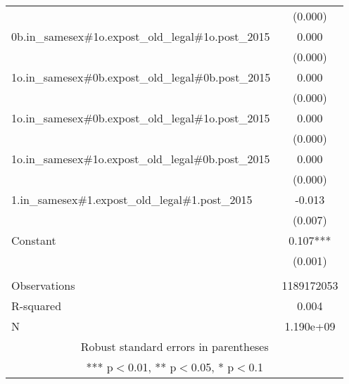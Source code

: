 \documentclass[]{article}
\begin{document}
\begin{tabular}{lc}
 & (0.000) \\
0b.in\_samesex\#1o.expost\_old\_legal\#1o.post\_2015 & 0.000 \\
 & (0.000) \\
1o.in\_samesex\#0b.expost\_old\_legal\#0b.post\_2015 & 0.000 \\
 & (0.000) \\
1o.in\_samesex\#0b.expost\_old\_legal\#1o.post\_2015 & 0.000 \\
 & (0.000) \\
1o.in\_samesex\#1o.expost\_old\_legal\#0b.post\_2015 & 0.000 \\
 & (0.000) \\
1.in\_samesex\#1.expost\_old\_legal\#1.post\_2015 & -0.013 \\
 & (0.007) \\
Constant & 0.107*** \\
 & (0.001) \\
 &  \\
Observations & 1189172053 \\
R-squared & 0.004 \\
 N & 1.190e+09 \\ \hline
\multicolumn{2}{c}{ Robust standard errors in parentheses} \\
\multicolumn{2}{c}{ *** p$<$0.01, ** p$<$0.05, * p$<$0.1} \\
\end{tabular}
\end{document}
